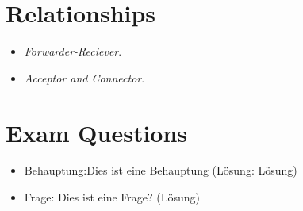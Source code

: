 \section{Relationships}
\begin{itemize}
	\item \textit{Forwarder-Reciever}.
	\item \textit{Acceptor and Connector}.
\end{itemize}

\section{Exam Questions}
\begin{itemize}
  	\item Behauptung:Dies ist eine Behauptung (Lösung: Lösung)
    \item Frage: Dies ist eine Frage? (Lösung)
\end{itemize}
